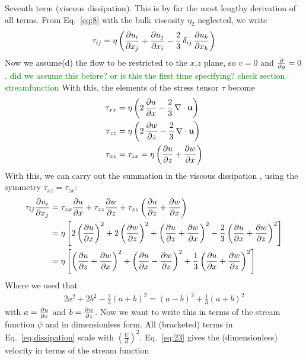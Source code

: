 \documentclass[document.tex]{subfiles}
\begin{document}
\begin{mdframed}
    Seventh term (viscous dissipation). This is by far the most lengthy derivation of all terms. From Eq.~\eqref{eq:8} with the bulk viscosity $\eta_2$ neglected, we write 
    \begin{align*}
        \tau_{ij} = \eta \left( \pdv{u_i}{x_j} + \pdv{u_j}{x_i} - \frac{2}{3}\,\delta_{ij}\,\pdv{u_k}{x_k} \right)
    \end{align*}
    Now we assume(d) the flow to be restricted to the $x$,$z$ plane, so $v=0$ and $\pdv{y} =0$. \textcolor{green}{did we assume this before? or is this the first time specifying? check section streamfunction}
    With this, the elements of the stress tensor $\tau$ become
    \begin{align*}
        \tau_{xx} &= \eta \left( 2\,\pdv{u}{x} - \frac{2}{3}\,\nabla \cdot \mathbf{u} \right) \\
        \tau_{zz} &= \eta \left( 2\,\pdv{w}{z} - \frac{2}{3}\,\nabla \cdot \mathbf{u} \right) \\
        \tau_{xz} &= \tau_{zx} = \eta \left( \pdv{u}{z} + \pdv{w}{x} \right) \\
    \end{align*} 
    With this, we can carry out the summation in the viscous dissipation , using the symmetry $\tau_{xz} = \tau_{zx}$: 
    \begin{align} \label{eq:dissipation}
            \tau_{ij}\pdv{u_i}{x_j} &= \tau_{xx}\pdv{u}{x} + \tau_{zz}\pdv{w}{z} + \tau_{xz}\left(\pdv{u}{z} + \pdv{w}{x}\right) \notag\\
     &= \eta \left[ 2\left(\pdv{u}{x}\right)^{2} + 2\left(\pdv{w}{z}\right)^{2}
        + \left( \pdv{u}{z} + \pdv{w}{x} \right)^{2}
        - \frac{2}{3}\left( \pdv{u}{x} + \pdv{w}{z} \right)^{2} \right] \notag\\
    &= \eta \left[ \left( \pdv{u}{z} + \pdv{w}{x} \right)^{2}
        + \left( \pdv{u}{x} - \pdv{w}{z} \right)^{2}
        + \frac{1}{3}\left( \pdv{u}{x} + \pdv{w}{z} \right)^{2} \right]
    \end{align} 
    Where we used that 
    \begin{align*}
        2a^{2} + 2b^{2} - \frac{2}{3}(a+b)^{2} = (a-b)^{2} + \frac{1}{3}(a+b)^{2}
    \end{align*}
    with $a = \pdv{u}{x}$ and  $b = \pdv{w}{z}$. 
    Now we want to write this in terms of the stream function $\psi$ and in dimensionless form.
    All (bracketed) terms in Eq.~\eqref{eq:dissipation} scale with $\left(\frac{U}{d}\right)^2$.
    Eq.~\eqref{eq:23} gives the (dimensionless) velocity in terms of the stream function 

\end{mdframed}
\end{document}
